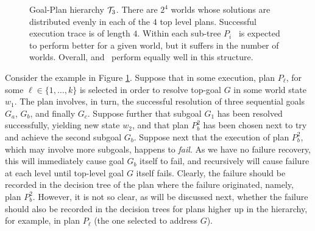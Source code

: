 \begin{figure}[t]
\begin{center}

\end{center}
\caption{Goal-Plan hierarchy ${\mathcal{T}}_3$. There are $2^4$ worlds whose solutions are distributed evenly in each of the $4$ top level plans. Successful execution trace is of length $4$. Within each sub-tree $P_i$ \BUL\ is expected to perform better for a given world, but it suffers in the number of worlds. Overall, \CL and \BUL\ perform equally well in this structure.}

%
\label{fig:T3}
\end{figure}



Consider the example in Figure \ref{fig:T3}.
Suppose that in some execution, plan $P_\ell$, for some $\ell \in \{1,\ldots,k\}$
is selected in order to resolve top-goal $G$ in some world state $w_1$. The plan
involves, in turn, the successful resolution of three sequential goals $G_a$,
$G_b$, and finally $G_c$. Suppose further that subgoal $G_1$ has been resolved
successfully, yielding new state $w_2$, and that plan $P_b^2$ has been chosen
next to try and achieve the second subgoal $G_b$.
Suppose next that the execution of plan $P_b^2$, which may involve more subgoals,
happens to \emph{fail}. As we have no failure recovery, this will immediately
cause goal $G_b$ itself to fail, and recursively will cause failure at each level
until top-level goal $G$ itself fails.
Clearly, the failure should be recorded in the decision tree of the plan where
the failure originated, namely, plan $P_b^2$. However, it is not so clear, as
will be discussed next, whether the failure should also be recorded in the
decision trees for plans higher up in the hierarchy, for example, in plan
$P_\ell$ (the one selected to address $G$).


